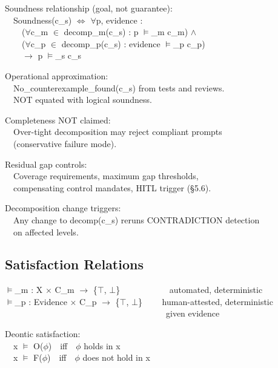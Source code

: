 \begin{claddisp}
Soundness relationship (goal, not guarantee):\\
~~Soundness(c\_s) $\Leftrightarrow$ $\forall$p, evidence :\\
~~~~($\forall$c\_m $\in$ decomp\_m(c\_s) : p $\vDash$\_m c\_m) $\wedge$\\
~~~~($\forall$c\_p $\in$ decomp\_p(c\_s) : evidence $\vDash$\_p c\_p)\\
~~~~$\to$ p $\vDash$\_s c\_s
\par\smallskip
Operational approximation:\\
~~No\_counterexample\_found(c\_s) \textemdash{} from tests and reviews.\\
~~NOT equated with logical soundness.
\par\smallskip
Completeness NOT claimed:\\
~~Over-tight decomposition may reject compliant prompts\\
~~(conservative failure mode).
\par\smallskip
Residual gap controls:\\
~~Coverage requirements, maximum gap thresholds,\\
~~compensating control mandates, HITL trigger (\S{}5.6).
\par\smallskip
Decomposition change triggers:\\
~~Any change to decomp(c\_s) reruns CONTRADICTION detection\\
~~on affected levels.
\end{claddisp}


\subsection{Satisfaction Relations}
\label{sec:formal-model-A-1-10}


\begin{cladnote}
$\vDash$\_m : X $\times$ C\_m $\to$ \{$\top$, $\bot$\}~~~~~~~~~~~\textemdash{} automated, deterministic\\
$\vDash$\_p : Evidence $\times$ C\_p $\to$ \{$\top$, $\bot$\}~~~~\textemdash{} human-attested, deterministic\\
~~~~~~~~~~~~~~~~~~~~~~~~~~~~~~~~~~~~~~given evidence
\par\smallskip
Deontic satisfaction:\\
~~x $\vDash$ O($\phi$)~~iff~~$\phi$ holds in x\\
~~x $\vDash$ F($\phi$)~~iff~~$\phi$ does not hold in x
\end{cladnote}


